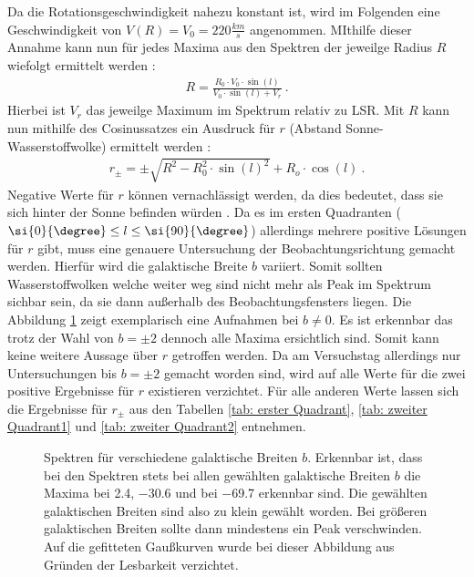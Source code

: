 Da die Rotationsgeschwindigkeit nahezu konstant ist, wird im Folgenden eine Geschwindigkeit von $V(R) = V_0 = \si{220}{\frac{km}{s}}$ angenommen. MIthilfe dieser Annahme kann nun für jedes Maxima aus den Spektren der jeweilge Radius $R$ wiefolgt ermittelt werden \cite{Usermanual}:
\begin{align}
    R =\frac{R_0 \cdot V_0 \cdot \sin(l)}{V_0 \cdot \sin(l) + V_r} \ .
    \label{eq:BerechnungR}
\end{align}
Hierbei ist $V_r$ das jeweilge Maximum im Spektrum relativ zu LSR.\newline
Mit $R$ kann nun mithilfe des Cosinussatzes ein Ausdruck für $r$ (Abstand Sonne-Wasserstoffwolke) ermittelt werden \cite{Usermanual}:
\begin{align}
    r_{\pm} = \pm \sqrt{R^2 - R_0^2 \cdot \sin(l)^2} + R_o \cdot \cos(l) \ .
    \label{eq:Berechnungr}
\end{align}
Negative Werte für $r$ können vernachlässigt werden, da dies bedeutet, dass sie sich hinter der Sonne befinden würden \cite{Usermanual}. Da es im ersten Quadranten ($ \si{0}{\degree} \le l \le \si{90}{\degree}$) allerdings mehrere positive Lösungen für $r$ gibt, muss eine genauere Untersuchung der Beobachtungsrichtung gemacht werden. Hierfür wird die galaktische Breite $b$ variiert. Somit sollten Wasserstoffwolken welche weiter weg sind nicht mehr als Peak im Spektrum sichbar sein, da sie dann außerhalb des Beobachtungsfensters liegen. Die Abbildung \ref{fig:bungleichnull} zeigt exemplarisch eine Aufnahmen bei $b \neq 0$. Es ist erkennbar das trotz der Wahl von $b = \pm 2$ dennoch alle Maxima ersichtlich sind. Somit kann keine weitere Aussage über $r$ getroffen werden. Da am Versuchstag allerdings nur Untersuchungen bis $b = \pm 2$ gemacht worden sind, wird auf alle Werte für die zwei positive Ergebnisse für $r$ existieren verzichtet. Für alle anderen Werte lassen sich die Ergebnisse für $r_{\pm}$ aus den Tabellen \ref{tab: erster Quadrant}, \ref{tab: zweiter Quadrant1} und \ref{tab: zweiter Quadrant2} entnehmen.
\begin{figure}[H]
    \centering
       
    \caption[Spektren für verschiedene galaktische Breiten $b$]{Spektren für verschiedene galaktische Breiten $b$. Erkennbar ist, dass bei den Spektren stets bei allen gewählten galaktische Breiten $b$ die Maxima bei \SI{2.4}{}, \SI{-30.6}{} und bei \SI{-69.7}{} erkennbar sind. Die gewählten galaktischen Breiten sind also zu klein gewählt worden. Bei größeren galaktischen Breiten sollte dann mindestens ein Peak verschwinden. Auf die gefitteten Gaußkurven wurde bei dieser Abbildung aus Gründen der Lesbarkeit verzichtet.}
    \label{fig:bungleichnull}
\end{figure}
